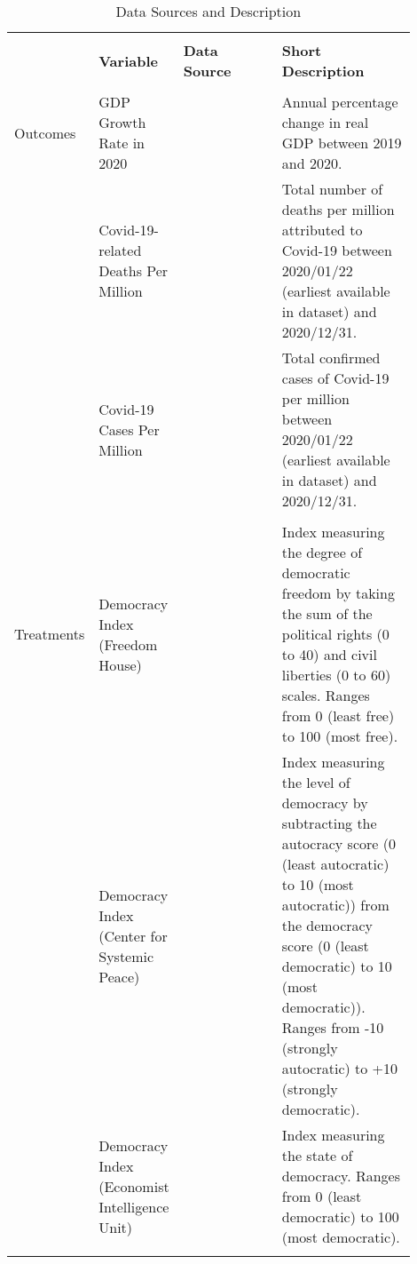
\begin{table}[!htbp]
    \centering
    \caption{Data Sources and Description} 
    \label{tab:sources}
    \scriptsize
\begin{tabularx}{\linewidth}{p{0.07\linewidth} p{0.2\linewidth} p{0.27\linewidth} p{0.36\linewidth}} 
    \hline \\[-1.8ex]
    & \textbf{Variable}  &  \textbf{Data Source} & \textbf{Short Description}\\ 
    \hline \\[-1.8ex]
    
    Outcomes 
    & GDP Growth Rate in 2020 & \citet{internationalmonetaryfundWorldEconomicOutlook2020} & Annual percentage change in real GDP between 2019 and 2020.\\
    
    & Covid-19-related Deaths Per Million & \citet{CSSE} & Total number of deaths per million attributed to Covid-19 between 2020/01/22 (earliest available in dataset) and 2020/12/31. \\
    
    & Covid-19 Cases Per Million & \citet{CSSE} & Total confirmed cases of Covid-19 per million between 2020/01/22 (earliest available in dataset) and 2020/12/31. \\
    \hline \\[-1.8ex]
    
    Treatments 
    
    & Democracy Index (Freedom House) & \citet{freedomhouseFreedomWorld20202020} &  Index measuring the degree of democratic freedom by taking the sum of the political rights (0 to 40) and civil liberties (0 to 60) scales. Ranges from 0 (least free) to 100 (most free).  \\
    
     & Democracy Index (Center for Systemic Peace) & \citet{centerforsystemicpeacePolity5AnnualTime2018} &  Index measuring the level of democracy by subtracting the autocracy score (0 (least autocratic) to 10 (most autocratic)) from the democracy score (0 (least democratic) to 10 (most democratic)). Ranges from -10 (strongly autocratic) to +10 (strongly democratic).\\ 
    
     & Democracy Index (Economist Intelligence Unit) & \citet{DemocracyIndex2020} & Index measuring the state of democracy. Ranges from 0 (least democratic) to 100 (most democratic). \\

\hline \\[-1.8ex]


\end{tabularx}
\end{table}
